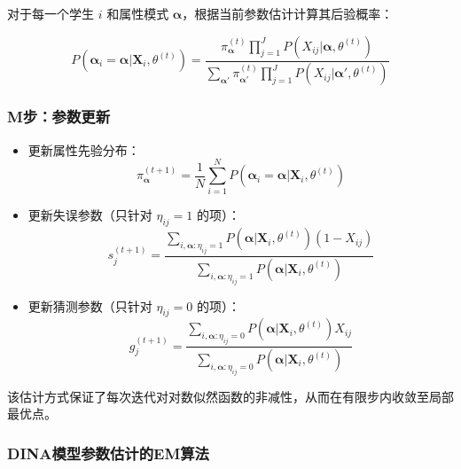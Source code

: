 \documentclass[a4paper,12pt]{ctexart} %
\begin{document}
对于每一个学生 $i$ 和属性模式 $\boldsymbol{\alpha}$，根据当前参数估计计算其后验概率：

\begin{equation}
    P(\boldsymbol{\alpha}_i = \boldsymbol{\alpha} | \boldsymbol{X}_i, \theta^{(t)}) = \frac{\pi_{\boldsymbol{\alpha}}^{(t)} \prod_{j=1}^{J} P(X_{ij} | \boldsymbol{\alpha}, \theta^{(t)})}{\sum_{\boldsymbol{\alpha}'} \pi_{\boldsymbol{\alpha}'}^{(t)} \prod_{j=1}^{J} P(X_{ij} | \boldsymbol{\alpha}', \theta^{(t)})}
\end{equation}


\subsubsection{M步：参数更新}

\begin{itemize}
  \item 更新属性先验分布：
  \begin{equation}
      \pi_{\boldsymbol{\alpha}}^{(t+1)} = \frac{1}{N} \sum_{i=1}^{N} P(\boldsymbol{\alpha}_i = \boldsymbol{\alpha} | \boldsymbol{X}_i, \theta^{(t)})
  \end{equation}

  \item 更新失误参数（只针对 $\eta_{ij}=1$ 的项）：
  \begin{equation}
      s_j^{(t+1)} = \frac{\sum_{i, \boldsymbol{\alpha}: \eta_{ij}=1} P(\boldsymbol{\alpha} | \boldsymbol{X}_i, \theta^{(t)}) (1 - X_{ij})}{\sum_{i, \boldsymbol{\alpha}: \eta_{ij}=1} P(\boldsymbol{\alpha} | \boldsymbol{X}_i, \theta^{(t)})}
  \end{equation}
  \item 更新猜测参数（只针对 $\eta_{ij}=0$ 的项）：
  \begin{equation}
      g_j^{(t+1)} = \frac{\sum_{i, \boldsymbol{\alpha}: \eta_{ij}=0} P(\boldsymbol{\alpha} | \boldsymbol{X}_i, \theta^{(t)}) X_{ij}}{\sum_{i, \boldsymbol{\alpha}: \eta_{ij}=0} P(\boldsymbol{\alpha} | \boldsymbol{X}_i, \theta^{(t)})}
  \end{equation}

\end{itemize}

该估计方式保证了每次迭代对对数似然函数的非减性，从而在有限步内收敛至局部最优点。

\subsubsection{DINA模型参数估计的EM算法}
\end{document}

